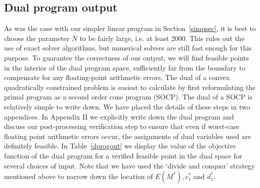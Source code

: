 \documentclass[12pt]{article}
\numberwithin{equation}{section}
\begin{document}
\subsection{Dual program output} 


As was the case with our simpler linear program in Section~\ref{simpsec}, it is best to choose the parameter $N$ to be fairly large, i.e. at least 2000. This rules out the use of exact solver algorithms, but numerical solvers are still fast enough for this purpose. To guarantee the correctness of our output, we will find feasible points in the interior of the dual program space, sufficiently far from the boundary to compensate for any floating-point arithmetic errors. The dual of a convex quadratically constrained problem is easiest to calculate by first reformulating the primal program as a second order cone program (SOCP). The dual of a SOCP is relatively simple to write down. We have placed the details of these steps in two appendices. In Appendix II we explicitly write down the dual program and discuss our post-processing verification step to ensure that even if worst-case floating point arithmetic errors occur, the assignments of dual variables used are definitely feasible. In Table~\ref{dprogout} we display the value of the objective function of the dual program for a verified feasible point in the dual space for several choices of input. Note that we have used the `divide and conquer' strategy mentioned above to narrow down the location of $E(M^\ast),c_1^\ast$ and $d_1^\ast$.  





\end{document}
